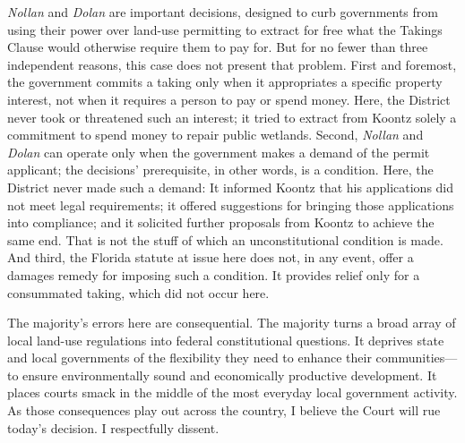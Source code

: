 \textit{Nollan} and \textit{Dolan} are important decisions, designed to curb
governments from using their power over land-use permitting to extract for free
what the Takings Clause would otherwise require them to pay for. But for no
fewer than three independent reasons, this case does not present that problem.
First and foremost, the government commits a taking only when it appropriates a
specific property interest, not when it requires a person to pay or spend money.
Here, the District never took or threatened such an interest; it tried to
extract from Koontz solely a commitment to spend money to repair public
wetlands. Second, \textit{Nollan} and \textit{Dolan} can operate only when the
government makes a demand of the permit applicant; the decisions' prerequisite,
in other words, is a condition. Here, the District never made such a demand: It
informed Koontz that his applications did not meet legal requirements; it
offered suggestions for bringing those applications into compliance; and it
solicited further proposals from Koontz to achieve the same end. That is not the
stuff of which an unconstitutional condition is made. And third, the Florida
statute at issue here does not, in any event, offer a damages remedy for
imposing such a condition. It provides relief only for a consummated taking,
which did not occur here.

The majority's errors here are consequential. The majority turns a broad array
of local land-use regulations into federal constitutional questions. It deprives
state and local governments of the flexibility they need to enhance their
communities---to ensure environmentally sound and economically productive
development. It places courts smack in the middle of the most everyday local
government activity. As those consequences play out across the country, I
believe the Court will rue today's decision. I respectfully dissent.

